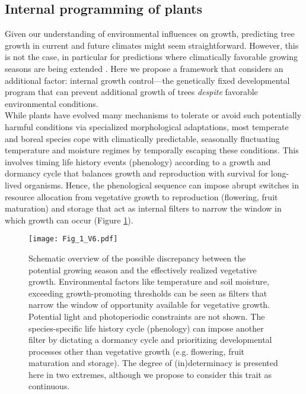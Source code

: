 \documentclass{article}
\begin{document}
		
		\subsection*{Internal programming of plants}
		Given our understanding of environmental influences on growth, predicting tree growth in current and future climates might seem straightforward. However, this is not the case, in particular for predictions where climatically favorable growing seasons are being extended \citep{zohnerHowChangesSpring2021}. Here we propose a framework that considers an additional factor: internal growth control---the genetically fixed developmental program that can prevent additional growth of trees \textit{despite} favorable environmental conditions.\\
		
		While plants have evolved many mechanisms to tolerate or avoid such potentially harmful conditions via specialized morphological adaptations, most temperate and boreal species cope with climatically predictable, seasonally fluctuating temperature and moisture regimes by temporally escaping these conditions. This involves timing life history events (phenology) according to a growth and dormancy cycle that balances growth and reproduction with survival for long-lived organisms. Hence, the phenological sequence can impose abrupt switches in resource allocation from vegetative growth to reproduction (flowering, fruit maturation) and storage \citep{stearnsTradeOffsLifeHistoryEvolution1989, chapinEcologyEconomicsStorage1990} that act as internal filters to narrow the window in which growth can occur (Figure \ref{fig:fig_1xxx}).\\
			
		
								\begin{figure}
								\centering
								\texttt{[image: Fig\_1\_V6.pdf]} 
								\caption{Schematic overview of the possible discrepancy between the potential growing season and the effectively realized vegetative growth. Environmental factors like temperature and soil moisture, exceeding growth-promoting thresholds can be seen as filters that narrow the window of opportunity available for vegetative growth. Potential light and photoperiodic constraints are not shown. The species-specific life history cycle (phenology) can impose another filter by dictating a dormancy cycle and prioritizing developmental processes other than vegetative growth (e.g. flowering, fruit maturation and storage). The degree of (in)determinacy is presented here in two extremes, although we propose to consider this trait as continuous.}
								\label{fig:fig_1xxx}
							\end{figure}
\end{document}
